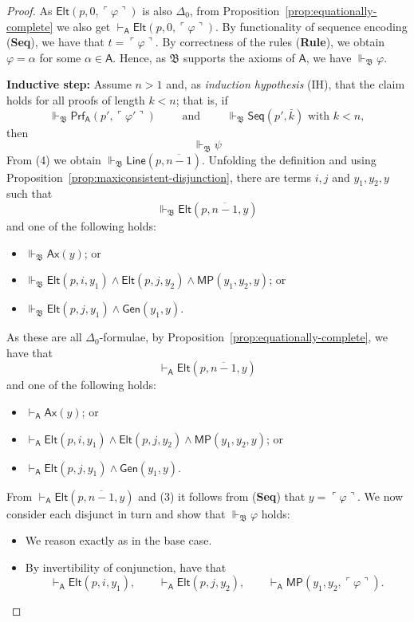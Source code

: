 \documentclass[10pt,a4paper]{amsart}
\newcommand{\Ax}{\textsf{Ax}}
\newcommand{\Elt}{\textsf{Elt}}
\newcommand{\Gen}{\textsf{Gen}}
\newcommand{\Line}{\textsf{Line}}
\newcommand{\MP}{\textsf{MP}}
\newcommand{\Prf}{\textsf{Prf}}
\newcommand{\Seq}{\textsf{Seq}}
\newcommand{\base}[1]{\mathfrak{#1}}
\newcommand{\pa}{\textsf{A}}
\renewcommand{\phi}{\varphi}
\newcommand{\supp}{\Vdash}
\begin{document}
\begin{proof}
As $\Elt(p,0,\ulcorner\varphi\urcorner)$ is also $\Delta_0$, from Proposition~\ref{prop:equationally-complete} we also get $\vdash_{\pa} \Elt(p,0,\ulcorner\varphi\urcorner)$. By functionality of sequence encoding (\textbf{Seq}), we have that $t = \ulcorner\varphi\urcorner$. By correctness of the rules (\textbf{Rule}), we obtain $\varphi = \alpha$ for some $\alpha \in \pa$. Hence, as $\base{B}$ supports the axioms of $\pa$, we have $\supp_{\base{B}} \varphi$.

\smallskip
\noindent\textbf{Inductive step:} Assume $n>1$ and, as \emph{induction hypothesis} (IH), that the claim holds for all
proofs of length $k<n$; that is, if
\[
\supp_{\base{B}} \Prf_{\pa}(p', \ulcorner \varphi' \urcorner) \qquad \text{ and } \qquad \supp_{\base{B}} \Seq(p',\bar{k}) \text{ with } k<n, 
\]
then 
\[
\supp_{\base{B}} \psi
\]
From (4) we obtain
$\supp_{\base{B}}\Line(p,\overline{n-1})$. 
Unfolding the definition and using Proposition~\ref{prop:maxiconsistent-disjunction}, there are terms
$i,j$ and $y_1,y_2,y$ such that
\[
\supp_{\base{B}}\Elt(p,\overline{n-1},y)
\]
and one of the following holds:
\begin{itemize}
\item $\supp_{\base{B}}\Ax(y)$; or
\item $\supp_{\base{B}}
\Elt(p,i,y_1)\wedge \Elt(p,j,y_2)\wedge \MP(y_1,y_2,y)$; or
\item $\supp_{\base{B}}
\Elt(p,j,y_1)\wedge \Gen(y_1,y)$.
\end{itemize}
As these are all $\Delta_0$-formulae, by Proposition~\ref{prop:equationally-complete}, we have that
\[
\vdash_{\pa} \Elt(p,\overline{n-1},y)
\]
and one of the following holds:
\begin{itemize}
\item $\vdash_{\pa}\Ax(y)$; or
\item $\vdash_{\pa}\Elt(p,i,y_1)\wedge \Elt(p,j,y_2)\wedge \MP(y_1,y_2,y)$; or
\item $\vdash_{\pa}
\Elt(p,j,y_1)\wedge \Gen(y_1,y)$.
\end{itemize}
From $\vdash_{\pa} \Elt(p,\overline{n-1},y)$ and (3) it follows from (\textbf{Seq}) that $y= \ulcorner \varphi \urcorner$. We now consider each disjunct in turn and show that $\supp_{\base{B}} \phi$ holds: 
\begin{itemize}
    \item We reason exactly as in the base case.
    \item By invertibility of conjunction, have that
\[
\vdash_{\pa} \Elt(p, i, y_1),\qquad \vdash_{\pa}\Elt(p, j, y_2),\qquad \vdash_{\pa}\MP( y_1, y_2,\ulcorner\varphi\urcorner).
\]
\end{itemize}
\end{proof}
\end{document}
